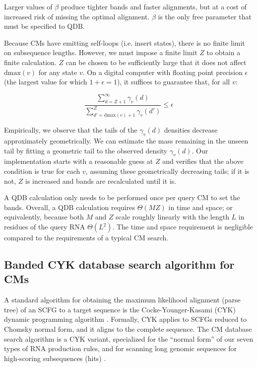 \documentclass[11pt]{article}
\begin{document}
Larger values of $\beta$ produce tighter bands and faster alignments,
but at a cost of increased risk of missing the optimal
alignment. $\beta$ is the only free parameter that must be specified
to QDB.

Because CMs have emitting self-loops (i.e. insert states), there is no
finite limit on subsequence lengths. However, we must impose a finite
limit $Z$ to obtain a finite calculation.  $Z$ can be chosen to be
sufficiently large that it does not affect $\mbox{dmax}(v)$ for any
state $v$.  On a digital computer with floating point precision
$\epsilon$ (the largest value for which $1+\epsilon = 1$), it suffices
to guarantee that, for all $v$:

\[
  \frac{ \sum_{d = Z+1}^{\infty}  \gamma_v(d)}
       { \sum_{d' = \mbox{dmax}(v) + 1}^{Z} \gamma_v(d')}  \leq \epsilon
\]

Empirically, we observe that the tails of the $\gamma_v(d)$ densities
decrease approximately geometrically. We can estimate the mass
remaining in the unseen tail by fitting a geometric tail to the
observed density $\gamma_v(d)$. Our implementation starts with a
reasonable guess at $Z$ and verifies that the above condition is true
for each $v$, assuming these geometrically decreasing tails; if it is
not, $Z$ is increased and bands are recalculated until it is.

A QDB calculation only needs to be performed once per query CM to set the
bands. Overall, a QDB calculation requires $\Theta(MZ)$ in time and
space; or equivalently, because both $M$ and $Z$ scale roughly
linearly with the length $L$ in residues of the query RNA
$\Theta(L^2)$. The time and space requirement is negligible compared
to the requirements of a typical CM search.

\subsection{Banded CYK database search algorithm for CMs}

A standard algorithm for obtaining the maximum likelihood alignment
(parse tree) of an SCFG to a target sequence is the
Cocke-Younger-Kasami (CYK) dynamic programming algorithm
\cite{Kasami65,Younger67,HopcroftUllman79}. Formally, CYK applies to
SCFGs reduced to Chomsky normal form, and it aligns to the complete
sequence. The CM database search algorithm is a CYK variant,
specialized for the ``normal form'' of our seven types of RNA
production rules, and for scanning long genomic sequences for
high-scoring subsequences (hits) \cite{Durbin98}.
\end{document}
